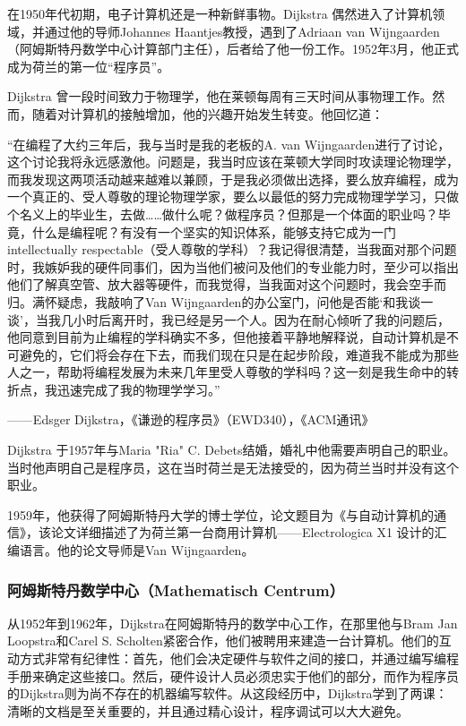 在1950年代初期，电子计算机还是一种新鲜事物。Dijkstra 偶然进入了计算机领域，并通过他的导师Johannes Haantjes教授，遇到了Adriaan van Wijngaarden（阿姆斯特丹数学中心计算部门主任），后者给了他一份工作。1952年3月，他正式成为荷兰的第一位“程序员”。  

Dijkstra 曾一段时间致力于物理学，他在莱顿每周有三天时间从事物理工作。然而，随着对计算机的接触增加，他的兴趣开始发生转变。他回忆道：  

“在编程了大约三年后，我与当时是我的老板的A. van Wijngaarden进行了讨论，这个讨论我将永远感激他。问题是，我当时应该在莱顿大学同时攻读理论物理学，而我发现这两项活动越来越难以兼顾，于是我必须做出选择，要么放弃编程，成为一个真正的、受人尊敬的理论物理学家，要么以最低的努力完成物理学学习，只做个名义上的毕业生，去做……做什么呢？做程序员？但那是一个体面的职业吗？毕竟，什么是编程呢？有没有一个坚实的知识体系，能够支持它成为一门 intellectually respectable（受人尊敬的学科）？我记得很清楚，当我面对那个问题时，我嫉妒我的硬件同事们，因为当他们被问及他们的专业能力时，至少可以指出他们了解真空管、放大器等硬件，而我觉得，当我面对这个问题时，我会空手而归。满怀疑虑，我敲响了Van Wijngaarden的办公室门，问他是否能‘和我谈一谈’，当我几小时后离开时，我已经是另一个人。因为在耐心倾听了我的问题后，他同意到目前为止编程的学科确实不多，但他接着平静地解释说，自动计算机是不可避免的，它们将会存在下去，而我们现在只是在起步阶段，难道我不能成为那些人之一，帮助将编程发展为未来几年里受人尊敬的学科吗？这一刻是我生命中的转折点，我迅速完成了我的物理学学习。”

—— Edsger Dijkstra，《谦逊的程序员》（EWD340），《ACM通讯》  

Dijkstra 于1957年与Maria "Ria" C. Debets结婚，婚礼中他需要声明自己的职业。当时他声明自己是程序员，这在当时荷兰是无法接受的，因为荷兰当时并没有这个职业。  

1959年，他获得了阿姆斯特丹大学的博士学位，论文题目为《与自动计算机的通信》，该论文详细描述了为荷兰第一台商用计算机——Electrologica X1 设计的汇编语言。他的论文导师是Van Wijngaarden。
\subsubsection{阿姆斯特丹数学中心（Mathematisch Centrum）}
从1952年到1962年，Dijkstra在阿姆斯特丹的数学中心工作，在那里他与Bram Jan Loopstra和Carel S. Scholten紧密合作，他们被聘用来建造一台计算机。他们的互动方式非常有纪律性：首先，他们会决定硬件与软件之间的接口，并通过编写编程手册来确定这些接口。然后，硬件设计人员必须忠实于他们的部分，而作为程序员的Dijkstra则为尚不存在的机器编写软件。从这段经历中，Dijkstra学到了两课：清晰的文档是至关重要的，并且通过精心设计，程序调试可以大大避免。

